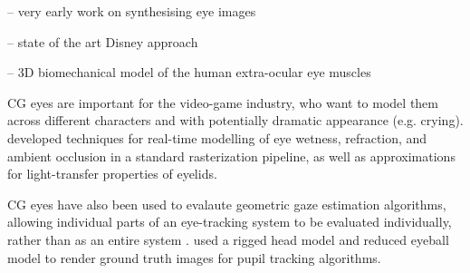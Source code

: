 \cite{feng1998variance} -- very early work on synthesising eye images

\cite{berard2014highquality} -- state of the art Disney approach


\cite{priamikov14_openeyesim} -- 3D biomechanical model of the human extra-ocular eye muscles


CG eyes are important for the video-game industry, who want to model them across different characters and with potentially dramatic appearance (e.g. crying). \citet{ActiBlizEyes} developed techniques for real-time modelling of eye wetness, refraction, and ambient occlusion in a standard rasterization pipeline, as well as approximations for light-transfer properties of eyelids.
 
CG eyes have also been used to evalaute geometric gaze estimation algorithms, allowing individual parts of an eye-tracking system to be evaluated individually, rather than as an entire system \cite{bohme2008software,swirski2014rendering}. \citet{swirski2014rendering} used a rigged head model and reduced eyeball model to render ground truth images for pupil tracking algorithms.


